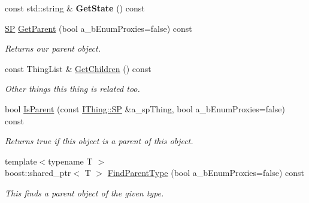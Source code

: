 \begin{DoxyCompactItemize}
\mbox{\label{class_i_thing_a5f2367cd88f65a32fa07a0d0bcbb7b09}} 
const std\+::string \& {\bfseries Get\+State} () const
\item 
\mbox{\label{class_i_thing_a664a3d5c43a4b25c9e2de9d835c2f66b}} 
\hyperlink{class_i_thing_a6e95654aef6362c48b9a2fd44a1f970a}{SP} \hyperlink{class_i_thing_a664a3d5c43a4b25c9e2de9d835c2f66b}{Get\+Parent} (bool a\+\_\+b\+Enum\+Proxies=false) const
\begin{DoxyCompactList}\small\item\em Returns our parent object. \end{DoxyCompactList}\item 
\mbox{\label{class_i_thing_ad4524a0d560a0fd038211e9643764f3d}} 
const Thing\+List \& \hyperlink{class_i_thing_ad4524a0d560a0fd038211e9643764f3d}{Get\+Children} () const
\begin{DoxyCompactList}\small\item\em Other things this thing is related too. \end{DoxyCompactList}\item 
\mbox{\label{class_i_thing_a3a8783dff6bfec6d5374b3b5d8c24ebc}} 
bool \hyperlink{class_i_thing_a3a8783dff6bfec6d5374b3b5d8c24ebc}{Is\+Parent} (const \hyperlink{class_i_thing_a6e95654aef6362c48b9a2fd44a1f970a}{I\+Thing\+::\+SP} \&a\+\_\+sp\+Thing, bool a\+\_\+b\+Enum\+Proxies=false) const
\begin{DoxyCompactList}\small\item\em Returns true if this object is a parent of this object. \end{DoxyCompactList}\item 
\mbox{\label{class_i_thing_a99c674fe6630d51b55c69e48fe546389}} 
{\footnotesize template$<$typename T $>$ }\\boost\+::shared\+\_\+ptr$<$ T $>$ \hyperlink{class_i_thing_a99c674fe6630d51b55c69e48fe546389}{Find\+Parent\+Type} (bool a\+\_\+b\+Enum\+Proxies=false) const
\begin{DoxyCompactList}\small\item\em This finds a parent object of the given type. \end{DoxyCompactList}\item 
\mbox{\label{class_i_thing_a2c52ee1221dd4c9248c45abfdee7730f}} 

\end{DoxyCompactItemize}
